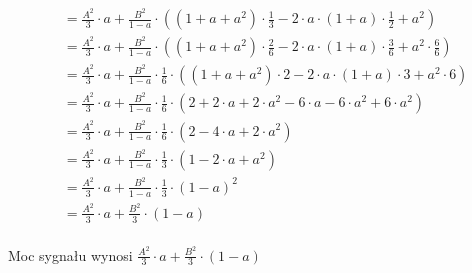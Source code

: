\begin{task}
\begin{align*}
 &=\frac{A^2}{3}\cdot a
 +\frac{B^2}{1 - a} \cdot \left( \left(1 +a + a^2 \right)\cdot \frac{1}{3}
 - 2 \cdot a \cdot \left( 1 + a \right) \cdot \frac{1}{2}
 + a^2 \right)\\
 &=\frac{A^2}{3}\cdot a
 +\frac{B^2}{1 - a} \cdot \left( \left(1 +a + a^2 \right)\cdot \frac{2}{6} - 2 \cdot a \cdot \left( 1 + a \right) \cdot \frac{3}{6}
 + a^2 \cdot \frac{6}{6} \right)\\ 
 &=\frac{A^2}{3}\cdot a +\frac{B^2}{1 - a} \cdot \frac{1}{6} \cdot \left( \left(1 +a + a^2 \right)\cdot 2
 - 2\cdot a \cdot \left( 1 + a \right) \cdot 3
 + a^2 \cdot 6 \right)\\  
 &=\frac{A^2}{3}\cdot a
 +\frac{B^2}{1 - a} \cdot \frac{1}{6} \cdot \left( 2 +2\cdot a + 2\cdot a^2 - 6\cdot a - 6\cdot a^2 + 6 \cdot a^2 \right)\\
 &=\frac{A^2}{3}\cdot a
 +\frac{B^2}{1 - a} \cdot \frac{1}{6} \cdot \left( 2 - 4 \cdot a + 2\cdot a^2 \right)\\
 &=\frac{A^2}{3}\cdot a +\frac{B^2}{1 - a} \cdot \frac{1}{3} \cdot \left( 1 - 2 \cdot a + a^2 \right)\\
 &=\frac{A^2}{3}\cdot a +\frac{B^2}{1 - a} \cdot \frac{1}{3} \cdot \left( 1 - a \right)^2\\
 &=\frac{A^2}{3}\cdot a + \frac{B^2}{3} \cdot \left( 1 - a \right)\\
\end{align*}

Moc sygnału wynosi $\frac{A^2}{3}\cdot a + \frac{B^2}{3} \cdot \left( 1 - a \right)$
\end{task}
